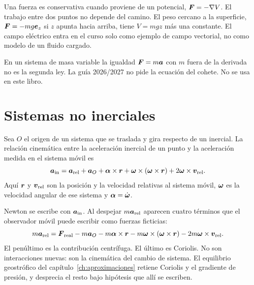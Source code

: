 Una fuerza es conservativa cuando proviene de un potencial, \(\boldsymbol{F}=-\nabla V\). El trabajo entre dos puntos no depende del camino. El peso cercano a la superficie, \(\boldsymbol{F}=-mg\boldsymbol{e}_z\) si \(z\) apunta hacia arriba, tiene \(V=mgz\) más una constante. El campo eléctrico entra en el curso solo como ejemplo de campo vectorial, no como modelo de un fluido cargado.

\begin{errorbox}
En un sistema de masa variable la igualdad \(\boldsymbol{F}=m\boldsymbol{a}\) con \(m\) fuera de la derivada no es la segunda ley. La guía 2026/2027 no pide la ecuación del cohete. No se usa en este libro.
\end{errorbox}

\section{Sistemas no inerciales}

Sea \(O\) el origen de un sistema que se traslada y gira respecto de un inercial. La relación cinemática entre la aceleración inercial de un punto y la aceleración medida en el sistema móvil es
\begin{equation}
\label{eq:aceleracion-no-inercial}
\boldsymbol{a}_{\mathrm{in}}
=\boldsymbol{a}_{\mathrm{rel}}
+\boldsymbol{a}_{O}
+\boldsymbol{\alpha}\times\boldsymbol{r}
+\boldsymbol{\omega}\times(\boldsymbol{\omega}\times\boldsymbol{r})
+2\boldsymbol{\omega}\times\boldsymbol{v}_{\mathrm{rel}}.
\end{equation}
Aquí \(\boldsymbol{r}\) y \(\boldsymbol{v}_{\mathrm{rel}}\) son la posición y la velocidad relativas al sistema móvil, \(\boldsymbol{\omega}\) es la velocidad angular de ese sistema y \(\boldsymbol{\alpha}=\dot{\boldsymbol{\omega}}\).

Newton se escribe con \(\boldsymbol{a}_{\mathrm{in}}\). Al despejar \(m\boldsymbol{a}_{\mathrm{rel}}\) aparecen cuatro términos que el observador móvil puede escribir como fuerzas ficticias:
\begin{equation}
\label{eq:ficticias}
m\boldsymbol{a}_{\mathrm{rel}}
=\boldsymbol{F}_{\mathrm{real}}
-m\boldsymbol{a}_{O}
-m\boldsymbol{\alpha}\times\boldsymbol{r}
-m\boldsymbol{\omega}\times(\boldsymbol{\omega}\times\boldsymbol{r})
-2m\boldsymbol{\omega}\times\boldsymbol{v}_{\mathrm{rel}}.
\end{equation}
El penúltimo es la contribución centrífuga. El último es Coriolis. No son interacciones nuevas: son la cinemática del cambio de sistema. El equilibrio geostrófico del capítulo~\ref{ch:aproximaciones} retiene Coriolis y el gradiente de presión, y desprecia el resto bajo hipótesis que allí se escriben.

